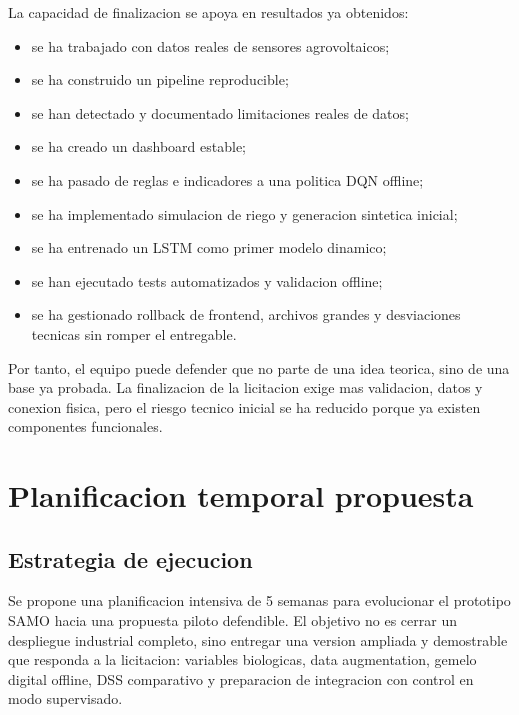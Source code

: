 ﻿\documentclass[11pt,a4paper]{article}
\begin{document}
La capacidad de finalizacion se apoya en resultados ya obtenidos:

\begin{itemize}
    \item se ha trabajado con datos reales de sensores agrovoltaicos;
    \item se ha construido un pipeline reproducible;
    \item se han detectado y documentado limitaciones reales de datos;
    \item se ha creado un dashboard estable;
    \item se ha pasado de reglas e indicadores a una politica DQN offline;
    \item se ha implementado simulacion de riego y generacion sintetica inicial;
    \item se ha entrenado un LSTM como primer modelo dinamico;
    \item se han ejecutado tests automatizados y validacion offline;
    \item se ha gestionado rollback de frontend, archivos grandes y desviaciones tecnicas sin romper el entregable.
\end{itemize}

Por tanto, el equipo puede defender que no parte de una idea teorica, sino de una base ya probada. La finalizacion de la licitacion exige mas validacion, datos y conexion fisica, pero el riesgo tecnico inicial se ha reducido porque ya existen componentes funcionales.

\newpage

\section{Planificacion temporal propuesta}

\subsection{Estrategia de ejecucion}

Se propone una planificacion intensiva de 5 semanas para evolucionar el prototipo SAMO hacia una propuesta piloto defendible. El objetivo no es cerrar un despliegue industrial completo, sino entregar una version ampliada y demostrable que responda a la licitacion: variables biologicas, data augmentation, gemelo digital offline, DSS comparativo y preparacion de integracion con control en modo supervisado.
\end{document}
